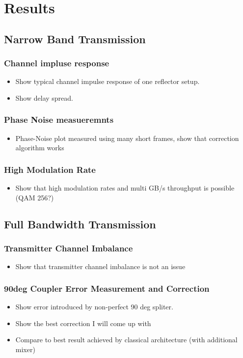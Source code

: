 
\chapter{Results}
\section{Narrow Band Transmission}
\subsection{Channel impluse response}
\begin{itemize}
\item Show typical channel impulse response of one reflector setup.
\item Show delay spread.
\end{itemize}

\subsection{Phase Noise measueremnts}
\begin{itemize}
\item Phase-Noise plot measured using many short frames, show that correction algorithm works
\end{itemize}

\subsection{High Modulation Rate}
\begin{itemize}
\item Show that high modulation rates and multi GB/s throughput is possible (QAM 256?)
\end{itemize}

\section{Full Bandwidth Transmission}
\subsection{Transmitter Channel Imbalance}
\begin{itemize}
\item Show that transmitter channel imbalance is not an issue
\end{itemize}

\subsection{90deg Coupler Error Measurement and Correction}
\begin{itemize}
\item Show error introduced by non-perfect 90 deg spliter.
\item Show the best correction I will come up with
\item Compare to best result achieved by classical architecture (with additional mixer)
\end{itemize}
